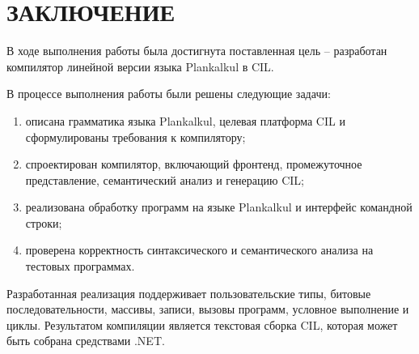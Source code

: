 \chapter*{ЗАКЛЮЧЕНИЕ}

В ходе выполнения работы была достигнута поставленная цель -- разработан компилятор линейной версии языка Plankalkul в CIL.

В процессе выполнения работы были решены следующие задачи:

\begin{enumerate}
	\item описана грамматика языка Plankalkul, целевая платформа CIL и сформулированы требования к компилятору;
	\item спроектирован компилятор, включающий фронтенд, промежуточное представление, семантический анализ и генерацию CIL;
	\item реализована обработку программ на языке Plankalkul и интерфейс командной строки;
	\item проверена корректность синтаксического и семантического анализа на тестовых программах.
\end{enumerate}

Разработанная реализация поддерживает пользовательские типы, битовые последовательности, массивы, записи, вызовы программ, условное выполнение и циклы.
Результатом компиляции является текстовая сборка CIL, которая может быть собрана средствами .NET.